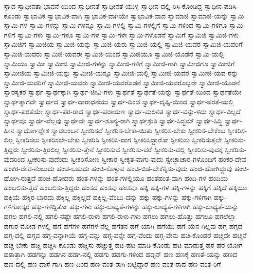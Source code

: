 {ಸ್ವಾದ
ಸ್ವಾಧೀನತಾ-ಭಾವನೆ-ಯಿಂದ
ಸ್ವಾಧೀನತೆ
ಸ್ವಾಧೀನತೆ-ಯುಳ್ಳ
ಸ್ವಾಧೀನ-ದಲ್ಲಿ-ರಿಸಿ-ಕೊಂಡಿದ್ದ
ಸ್ವಾಧೀನ-ಪಡಿಸಿ-ಕೊಂಡು
ಸ್ವಾಭಾವಿಕ
ಸ್ವಾಭಾವಿಕ-ವಾಗಿ
ಸ್ವಾಭಾವಿಕ-ವಾಗಿಯೇ
ಸ್ವಾಭಾವಿಕ-ವಾದ
ಸ್ವಾಮಾಜಿ
ಸ್ವಾಮಾಜಿ-ಯನ್ನು
ಸ್ವಾಮಿ
ಸ್ವಾಮಿ-ಗಳ
ಸ್ವಾಮಿ-ಗಳನ್ನು
ಸ್ವಾಮಿ-ಗಳನ್ನೂ
ಸ್ವಾಮಿ-ಗಳಲ್ಲಿ
ಸ್ವಾಮಿ-ಗಳಲ್ಲಿಗೆ
ಸ್ವಾಮಿ-ಗಳಿಂದ
ಸ್ವಾಮಿ-ಗಳಿಗೂ
ಸ್ವಾಮಿ-ಗಳಿಗೆ
ಸ್ವಾಮಿ-ಗಳು
ಸ್ವಾಮಿ-ಗಳೂ
ಸ್ವಾಮಿ-ಗಳೆ
ಸ್ವಾಮಿ-ಗಳೇ
ಸ್ವಾಮಿ-ಗಳೊಡನೆ
ಸ್ವಾಮಿಗೆ
ಸ್ವಾಮಿಜಿ
ಸ್ವಾಮಿಜಿ-ಗಳು
ಸ್ವಾಮಿಜಿಗೆ
ಸ್ವಾಮಿಜಿಯ
ಸ್ವಾಮಿಜಿ-ಯನ್ನು
ಸ್ವಾಮಿಜಿ-ಯರು
ಸ್ವಾಮಿಜಿ-ಯಲ್ಲಿ
ಸ್ವಾಮಿಜಿ-ಯವರ
ಸ್ವಾಮಿಜಿ-ಯವರಿಗೆ
ಸ್ವಾಮಿಜಿ-ಯವರು
ಸ್ವಾಮಿಜಿ-ಯವರೇ
ಸ್ವಾಮಿಜಿ-ಯಿಂದ
ಸ್ವಾಮಿಜಿಯೂ
ಸ್ವಾಮಿಜಿ-ಯೊಡನೆ
ಸ್ವಾಮಿ-ಯಲ್ಲಿ
ಸ್ವಾಮಿಯು
ಸ್ವಾಮೀ
ಸ್ವಾಮೀಜಿ
ಸ್ವಾಮೀಜಿ-ಗಳನ್ನು
ಸ್ವಾಮೀಜಿ-ಗಳಿಗೆ
ಸ್ವಾಮೀಜಿ-ಗಾಗಿ
ಸ್ವಾಮೀಜಿಗೂ
ಸ್ವಾಮೀಜಿಗೆ
ಸ್ವಾಮೀಜಿಯ
ಸ್ವಾಮೀಜಿ-ಯನ್ನು
ಸ್ವಾಮೀಜಿ-ಯನ್ನೂ
ಸ್ವಾಮೀಜಿ-ಯಲ್ಲಿ
ಸ್ವಾಮೀಜಿ-ಯವರ
ಸ್ವಾಮೀಜಿ-ಯವ-ರನ್ನು
ಸ್ವಾಮೀಜಿ-ಯವರಿಗೆ
ಸ್ವಾಮೀಜಿ-ಯವರು
ಸ್ವಾಮೀಜಿ-ಯವರೊಡನೆ
ಸ್ವಾಮೀಜಿ-ಯವರೊಬ್ಬರೇ
ಸ್ವಾಮೀಜಿ-ಯೊಡನೆ
ಸ್ವಾರಸ್ಯಕರ
ಸ್ವಾರ್ಥ
ಸ್ವಾರ್ಥಕ್ಕಾಗಿ
ಸ್ವಾರ್ಥ-ಜೀವಿ-ಗಳು
ಸ್ವಾರ್ಥತೆ
ಸ್ವಾರ್ಥತೆ-ಯನ್ನು
ಸ್ವಾರ್ಥತೆ-ಯಿಂದ
ಸ್ವಾರ್ಥತೆಯೇ
ಸ್ವಾರ್ಥತ್ಯಾಗವೇ
ಸ್ವಾರ್ಥದ
ಸ್ವಾರ್ಥ-ದಾರಾಧನೆಯು
ಸ್ವಾರ್ಥ-ದಿಂದ
ಸ್ವಾರ್ಥ-ದೃಷ್ಟಿ-ಯಿಂದ
ಸ್ವಾರ್ಥ-ಪರತೆ-ಯಲ್ಲಿ
ಸ್ವಾರ್ಥ-ಪರತೆಯೇ
ಸ್ವಾರ್ಥ-ಪರ-ರಾದ
ಸ್ವಾರ್ಥ-ಪರಾಯಣ
ಸ್ವಾರ್ಥ-ಮಲಿನತ
ಸ್ವಾರ್ಥ-ವನ್ನು-ಳಿದು
ಸ್ವಾರ್ಥ-ವಿಲ್ಲದೆ
ಸ್ವಾರ್ಥವೂ
ಸ್ವಾರ್ಥ-ವೆಲ್ಲವು
ಸ್ವಾರ್ಥವೇ
ಸ್ವಾರ್ಥ-ಶೂನ್ಯ-ರಾಗಿ
ಸ್ವಾರ್ಥಶ್ರುತಿ
ಸ್ವಾರ್ಥ-ಸಿದ್ಧಮ್
ಸ್ವಾರ್ಥ-ಸಿದ್ಧಿ
ಸ್ವಾರ್ಥ-ಹೀನ
ಸ್ವಾರ್ಥೋದ್ದೇಶ
ಸ್ವಾವಲಂಬನ
ಸ್ವೀಕರಿಸದೆ
ಸ್ವೀಕರಿಸ-ಬೇಕಾ-ಯಿತು
ಸ್ವೀಕರಿಸ-ಬೇಕು
ಸ್ವೀಕರಿಸ-ಬೇಕೆಂಬ
ಸ್ವೀಕರಿಸ-ಲಿಲ್ಲ
ಸ್ವೀಕರಿಸಲು
ಸ್ವೀಕರಿಸಲೇ-ಬೇಕು
ಸ್ವೀಕರಿಸಿ
ಸ್ವೀಕರಿಸಿ-ದಾಗ
ಸ್ವೀಕರಿಸಿದ್ದಾರೋ
ಸ್ವೀಕರಿಸು
ಸ್ವೀಕರಿಸುತ್ತಲೇ
ಸ್ವೀಕರಿಸು-ತ್ತಿದ್ದರು
ಸ್ವೀಕರಿಸು-ತ್ತಿರಲಿಲ್ಲ
ಸ್ವೀಕರಿಸು-ತ್ತೇನೆ
ಸ್ವೀಕರಿಸುವ
ಸ್ವೀಕರಿಸು-ವರೆ
ಸ್ವೀಕರಿಸು-ವಲ್ಲಿ
ಸ್ವೀಕರಿಸು-ವುದಕ್ಕೆ
ಸ್ವೀಕರಿಸು-ವುದರಿಂದ
ಸ್ವೀಕರಿಸು-ವುದೆಂದು
ಸ್ವೀಕರಿಸೋಣ
ಸ್ವೀಕಾರ
ಸ್ವೀಕೃತ-ವಾಗು-ವುದು
ಸ್ವೇಚ್ಛಾಚಾರ-ಗಳೊಂದಿಗೆ
ಹಂಕರ-ದೇವ
ಹಂಕರ-ದೇವ-ನೆಂಬುದು
ಹಂಚ-ಬಹುದು
ಹಂಚಿ-ಕೊಳ್ಳುವ
ಹಂಚಿ-ಬಿಡ-ಬೇಕೆನ್ನಿಸು-ವುದು
ಹಂಚಿ-ಹೋಗಿದ್ದುವು
ಹಂಚಿ-ಹೋಗಿ-ರುತ್ತದೆ
ಹಂಚಿ-ಹೋದರು
ಹಂತ-ಗಳನ್ನು
ಹಂತ-ಗಳಲ್ಲಿಯೂ
ಹಂತಹಂತ-ವಾಗಿ
ಹಂದಿ-ಗಳ
ಹಂದಿಯ
ಹಂಬಲಿಸು-ತ್ತದೆ
ಹಂಬಲಿಸು-ತ್ತಿದ್ದರು
ಹಂಸದ
ಹಂಸವು
ಹಂಸವೂ
ಹಕ್ಕಿ
ಹಕ್ಕಿ-ಗಳ
ಹಕ್ಕಿ-ಗಳನ್ನು
ಹಕ್ಕಿಗೆ
ಹಕ್ಕಿದೆ
ಹಕ್ಕಿಯು
ಹಕ್ಕಿಯೆ
ಹಕ್ಕಿರ-ಬಾರದು
ಹಕ್ಕಿಲ್ಲ
ಹಕ್ಕಿಲ್ಲದೆ
ಹಕ್ಕಿಲ್ಲ-ವೆಂಬು-ದನ್ನು
ಹಕ್ಕು
ಹಕ್ಕು-ಗಳನ್ನು
ಹಕ್ಕು-ಗಳಿಗಾಗಿ
ಹಕ್ಕು-ಗಳಿಗೋಸ್ಕರ
ಹಕ್ಕು-ಗಳಿದ್ದಿತೋ
ಹಕ್ಕು-ಗಳು
ಹಕ್ಕು-ಬಾಧ್ಯತೆ-ಗಳನ್ನು
ಹಕ್ಕು-ಬಾಧ್ಯತೆ-ಗಳಿಗಾಗಿ
ಹಕ್ಕು-ಬಾಧ್ಯತೆ-ಯನ್ನು
ಹಗಲ
ಹಗಲಿ-ನಲ್ಲಿ
ಹಗಲಿ-ನಷ್ಟೇ
ಹಗಲಿ-ರುಳು
ಹಗಲಿ-ರುಳು-ಗಳು
ಹಗಲು
ಹಗಲು-ಹೊತ್ತು
ಹಗಲೂ
ಹಗಲೆಲ್ಲಾ
ಹಗುರ-ಮೋಡ-ಗಳಲ್ಲಿ
ಹಗೆ
ಹಗೆಗಳ
ಹಗೆಗಳ-ನೆಲ್ಲ
ಹಗೆತನ
ಹಗೆ-ಯಾಗಿ
ಹಗೆಯು
ಹಗೆ-ಯೆನ-ಗಿಲ್ಲವು
ಹಗ್ಗ
ಹಗ್ಗದ
ಹಗ್ಗ-ದಲ್ಲಿ
ಹಗ್ಗವ
ಹಗ್ಗ-ವನ್ನಾಗಿಯೆ
ಹಗ್ಗ-ವನ್ನು
ಹಗ್ಗ-ವನ್ನೇ
ಹಗ್ಗ-ವೆಂದು
ಹಗ್ಗ-ವೇನು
ಹಚಿ-ಕೊಂಡರೆ
ಹಚ್ಚದೇ
ಹಚ್ಚನೆ
ಹಚ್ಚ-ಬೇಕು
ಹಚ್ಚಿ
ಹಚ್ಚಿಸಿ-ಕೊಂಡು
ಹಚ್ಚಿಸು
ಹಚ್ಚುತ್ತ
ಹಟ
ಹಟ-ಮಾಡಿ-ಕೊಂಡು
ಹಟ-ಮಾಡುತ್ತ
ಹಠ
ಹಠ-ಯೋಗ
ಹಠಾತ್ತಾಗಿ
ಹಡಗನ್ನು
ಹಡಗಿನ
ಹಡಗಿ-ನಲ್ಲಿ
ಹಡಗು
ಹಡಗು-ಗಳಿಂದ
ಹಡ್ಸನ್
ಹಣ
ಹಣಕ್ಕೆ
ಹಣತೆ-ಯನ್ನು
ಹಣದ
ಹಣ-ದಲ್ಲಿ
ಹಣ-ದಾಸೆ-ಗಾಗಿ
ಹಣ-ದಿಂದ
ಹಣ-ವಂತ-ರಾಗಿ-ಬಿಟ್ಟಿದ್ದಾರೆ
ಹಣ-ವಂತ-ರಾದ
ಹಣ-ವಂತ-ರಿಗೆ
}

